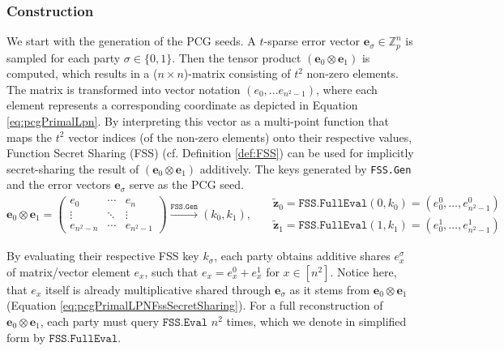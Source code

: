 \subsubsection{Construction}
We start with the generation of the PCG seeds. A $t$-sparse error vector $\mathbf{e}_\sigma \in \mathbb{Z}_p^n$ is sampled for each party $\sigma\in\{0,1\}$. Then the tensor product $(\mathbf{e}_0 \otimes \mathbf{e}_1)$ is computed, which results in a ($n\times n$)-matrix consisting of $t^2$ non-zero elements. The matrix is transformed into vector notation $(e_0, ... e_{n^2-1})$, where each element represents a corresponding coordinate as depicted in Equation \ref{eq:pcgPrimalLpn}. By interpreting this vector as a multi-point function that maps the $t^2$ vector indices (of the non-zero elements) onto their respective values, Function Secret Sharing (FSS) (cf. Definition \ref{def:FSS}) can be used for implicitly secret-sharing the result of $(\mathbf{e}_0 \otimes \mathbf{e}_1)$ additively. The keys generated by \texttt{FSS.Gen} and the error vectors $\mathbf{e}_\sigma$ serve as the PCG seed.
\begin{equation}
\label{eq:pcgPrimalLpn}
\mathbf{e}_0 \otimes \mathbf{e}_1 = 
\begin{pmatrix}
e_{0} & \cdots & e_{n} \\
\vdots & \ddots & \vdots \\
e_{n^2-n} & \cdots & e_{n^2-1}
\end{pmatrix}
\overset{\texttt{FSS.Gen}}{\longrightarrow}
(k_0, k_1), \:\:\:
\begin{aligned}
& \mathbf{\tilde{z}}_0 = \texttt{FSS.FullEval}(0, k_0) = (e_{0}^0, \ldots, e_{n^2-1}^0) \\
& \mathbf{\tilde{z}}_1 = \texttt{FSS.FullEval}(1, k_1) = (e_{0}^1, \ldots, e_{n^2-1}^1)
\end{aligned}
\end{equation}

By evaluating their respective FSS key $k_\sigma$, each party obtains additive shares $e_x^\sigma$ of matrix/vector element $e_x$, such that $e_x = e_x^0 + e_x^1$ for $ x\in [n^{2}]$. Notice here, that $e_x$ itself is already multiplicative shared through $\mathbf{e}_\sigma$ as it stems from $\mathbf{e}_0 \otimes \mathbf{e}_1$ (Equation \ref{eq:pcgPrimalLPNFssSecretSharing}). For a full reconstruction of $\mathbf{e}_0 \otimes \mathbf{e}_1$, each party must query $\texttt{FSS.Eval}$ $n^2$ times, which we denote in simplified form by $\texttt{FSS.FullEval}$.

